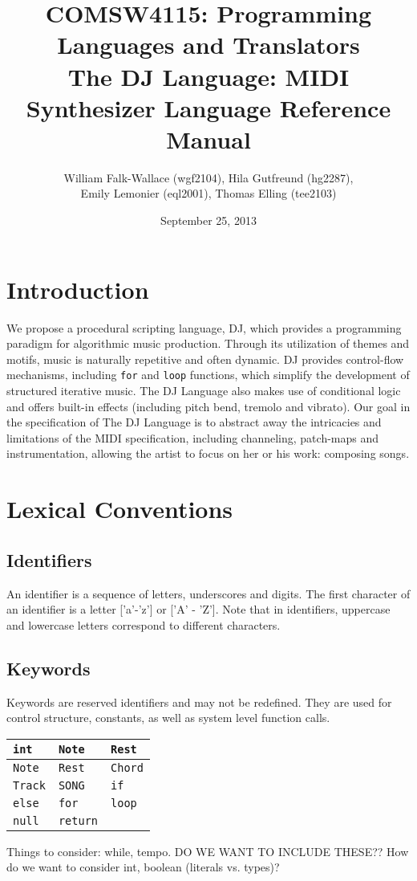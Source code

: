 \documentclass[letterpaper]{article}
\author{William Falk-Wallace (wgf2104), Hila Gutfreund (hg2287), \\Emily Lemonier (eql2001), Thomas Elling (tee2103)}
\title{COMSW4115: Programming Languages and Translators\\The DJ Language: MIDI Synthesizer Language Reference Manual}
\date{September 25, 2013}
\begin{document}
\maketitle
\tableofcontents 
\pagebreak[4]

\section{Introduction}
We propose a procedural scripting language, DJ, which provides a programming paradigm for algorithmic music production. Through its utilization of themes and motifs, music is naturally repetitive and often dynamic. DJ provides control-flow mechanisms, including \texttt{for} and \texttt{loop} functions, which simplify the development of structured iterative music. The DJ Language also makes use of conditional logic and offers built-in effects (including pitch bend, tremolo and vibrato).
Our goal in the specification of The DJ Language is to abstract away the intricacies and limitations of the MIDI specification, including channeling, patch-maps and instrumentation, allowing the artist to focus on her or his work: composing songs.

\section{Lexical Conventions}
\subsection{Identifiers}
An identifier is a sequence of letters, underscores and digits. The first character of an identifier is a letter ['a'-'z'] or ['A' - 'Z']. Note that in identifiers, uppercase and lowercase letters correspond to different characters.

\begin{samepage}
\subsection{Keywords}
Keywords are reserved identifiers and may not be redefined. They are used for control structure, constants, as well as system level function calls.
\begin{table}[H]
\centering
\begin{tabularx}{.75\textwidth}{|X|X|X|}
\hline
\texttt{int} & \texttt{Note} & \texttt{Rest} \\
\hline
\texttt{Note} &  \texttt{Rest} & \texttt{Chord} \\
\hline
\texttt{Track} & \texttt{SONG} & \texttt{if} \\
\hline
\texttt{else}  & \texttt{for} & \texttt{loop}\\
\hline
\texttt{null} & \texttt{return} &  \\
\hline
\end{tabularx}
\end{table}
Things to consider: while, tempo. DO WE WANT TO INCLUDE THESE??
How do we want to consider int, boolean (literals vs. types)?
\end{samepage}
\end{document}
